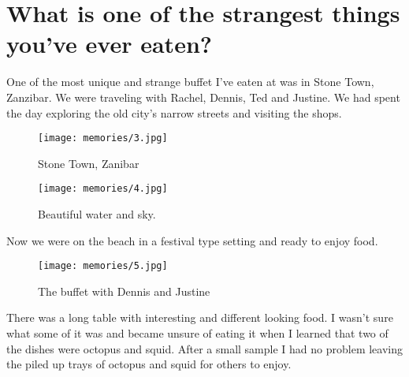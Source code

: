 \section{What is one of the strangest things you've ever eaten?}
One of the most unique and strange buffet I've eaten at was in Stone Town, Zanzibar.
We were traveling with Rachel, Dennis, Ted and Justine.
We had spent the day exploring the old city's narrow streets and visiting the shops.

\begin{figure}
\centering
\texttt{[image: memories/3.jpg]}
\caption{
Stone Town, Zanibar
}
\end{figure}

\begin{figure}
\centering
\texttt{[image: memories/4.jpg]}
\caption{
Beautiful water and sky.
}
\end{figure}

Now we were on the beach in a festival type setting and ready to enjoy food.

\begin{figure}
\centering
\texttt{[image: memories/5.jpg]}
\caption{
The buffet with Dennis and Justine
}
\end{figure}
There was a long table with interesting and different looking food.
I wasn't sure what some of it was and became unsure of eating it when I learned that two of the dishes were octopus and squid.
After a small sample I had no problem leaving the piled up trays of octopus and squid for others to enjoy.








